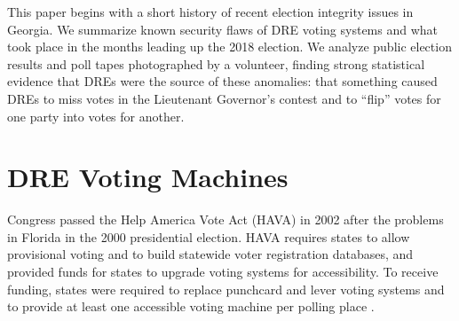 \documentclass[runningheads]{llncs}
\begin{document}
This paper begins with a short history of recent election integrity issues in Georgia.
We summarize known security flaws of DRE voting systems and
what took place in the months leading up the 2018 election.
We analyze public election results and poll tapes photographed by
a volunteer, finding strong statistical evidence that DREs were the source of these anomalies:
that something caused DREs to miss votes in the Lieutenant Governor's
contest and to ``flip'' votes for one party into votes for another.
%

\section{DRE Voting Machines}
Congress passed the Help America Vote Act (HAVA) in 2002 after the problems in
Florida in the 2000 presidential election.
HAVA requires states to allow provisional voting and to build statewide voter registration databases,
and provided funds for states to upgrade voting systems for accessibility.
To receive funding, states were required to replace punchcard and lever voting systems 
and to provide at least one
accessible voting machine per polling place \cite{jones_broken_2012}.
\end{document}
